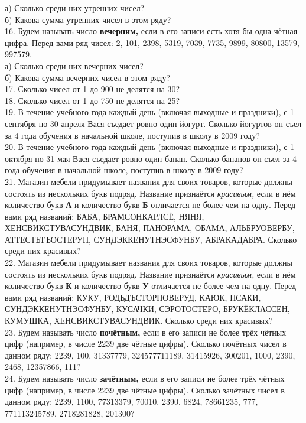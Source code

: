 а) Сколько среди них утренних чисел?\\
б) Какова сумма утренних чисел в этом ряду?\\
16. Будем называть число {\bf вечерним,} если в его записи есть хотя бы одна чётная цифра. Перед вами ряд чисел: 2, 101, 2398, 5319, 7039, 7735, 9899, 80800, 13579, 997579.\\
а) Сколько среди них вечерних чисел?\\
б) Какова сумма вечерних чисел в этом ряду?\\
17. Сколько чисел от 1 до 900 не делятся на 30?\\
18. Сколько чисел от 1 до 750 не делятся на 25?\\
19. В течение учебного года каждый день (включая выходные и праздники), с 1 сентября по 30 апреля Вася съедает ровно один йогурт. Сколько йогуртов он съел за 4 года обучения в начальной школе, поступив в школу в 2009 году?\\
20. В течение учебного года каждый день (включая выходные и праздники), с 1 октября по 31 мая Вася съедает ровно один банан. Сколько бананов он съел за 4 года обучения в начальной школе, поступив в школу в 2009 году?\\
21. Магазин мебели придумывает названия для своих товаров, которые должны состоять из нескольких букв подряд. Название признаётся {\it красивым,} если в нём количество букв {\bf А} и количество букв {\bf Б} отличается не более чем на одну. Перед вами ряд названий: БАБА, БРАМСОНКАРЛСЁ, НЯНЯ, ХЕНСВИКСТУВАСУНДВИК, БАНЯ, ПАНОРАМА, ОБАМА, АЛЬБРУОВЕРБУ, АТТЕСТЬТЪОСТЕРУП, СУНДЭККЕНУТНЭСФУНБУ, АБРАКАДАБРА. Сколько среди них красивых?\\
22. Магазин мебели придумывает названия для своих товаров, которые должны состоять из нескольких букв подряд. Название признаётся {\it красивым,} если в нём количество букв {\bf К} и количество букв {\bf У} отличается не более чем на одну. Перед вами ряд названий: КУКУ, РОДЬДЪСТОРПОВЕРУД, КАЮК, ПСАКИ, СУНДЭККЕНУТНЭСФУНБУ, КУСАЧКИ, СЭРОТОСТЕРО, БРУКЁКЛАССЕН, КУМУШКА, ХЕНСВИКСТУВАСУНДВИК. Сколько среди них красивых?\\
23. Будем называть число {\bf почётным,} если в его записи не более трёх чётных цифр (например, в числе 2239 две чётные цифры). Сколько почётных чисел в данном ряду: 2239, 100, 31337779, 324577711189, 31415926, 300201, 1000, 2390, 2468, 12357866, 111?\\
24. Будем называть число {\bf зачётным,} если в его записи не более трёх чётных цифр (например, в числе 2239 две чётные цифры). Сколько зачётных чисел в данном ряду: 2239, 1100, 77313379, 70010, 2390, 6824, 78661235, 777, 771113245789, 2718281828, 201300?\\
